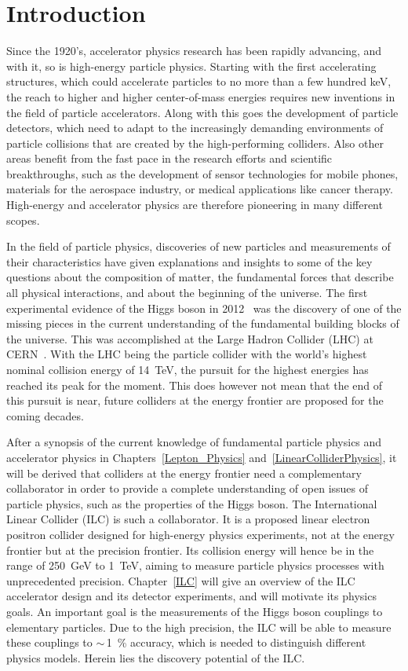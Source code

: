 \chapter{Introduction}
\label{Introduction}
Since the 1920's, accelerator physics research has been rapidly advancing, and with it, so is high-energy particle physics.
Starting with the first accelerating structures, which could accelerate particles to no more than a few hundred \si{\keV}, the reach to higher and higher center-of-mass energies requires new inventions in the field of particle accelerators.
Along with this goes the development of particle detectors, which need to adapt to the increasingly demanding environments of particle collisions that are created by the high-performing colliders.
Also other areas benefit from the fast pace in the research efforts and scientific breakthroughs, such as the development of sensor technologies for mobile phones, materials for the aerospace industry, or medical applications like cancer therapy.
High-energy and accelerator physics are therefore pioneering in many different scopes.

In the field of particle physics, discoveries of new particles and measurements of their characteristics have given explanations and insights to some of the key questions about the composition of matter, the fundamental forces that describe all physical interactions, and about the beginning of the universe.
The first experimental evidence of the Higgs boson in 2012~\cite{Higgs,Higgs2} was the discovery of one of the missing pieces in the current understanding of the fundamental building blocks of the universe.
This was accomplished at the Large Hadron Collider (LHC) at CERN~\cite{LHC_CERN}.
With the LHC being the particle collider with the world's highest nominal collision energy of \SI{14}{\TeV}, the pursuit for the highest energies has reached its peak for the moment.
This does however not mean that the end of this pursuit is near, future colliders at the energy frontier are proposed for the coming decades.

After a synopsis of the current knowledge of fundamental particle physics and accelerator physics in Chapters~\ref{Lepton_Physics} and~\ref{LinearColliderPhysics}, it will be derived that colliders at the energy frontier need a complementary collaborator in order to provide a complete understanding of open issues of particle physics, such as the properties of the Higgs boson.
The International Linear Collider (ILC) is such a collaborator.
It is a proposed linear electron positron collider designed for high-energy physics experiments, not at the energy frontier but at the precision frontier.
Its collision energy will hence be in the range of \SI{250}{\GeV} to \SI{1}{\TeV}, aiming to measure particle physics processes with unprecedented precision.
Chapter~\ref{ILC} will give an overview of the ILC accelerator design and its detector experiments, and will motivate its physics goals.
An important goal is the measurements of the Higgs boson couplings to elementary particles.
Due to the high precision, the ILC will be able to measure these couplings to $\sim$\,\SI{1}{\percent} accuracy, which is needed to distinguish different physics models.
Herein lies the discovery potential of the ILC.

